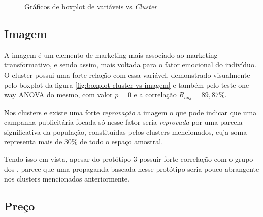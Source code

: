 \begin{figure}[h]
\begin{centering}
\par\end{centering}

\caption{Gráficos de boxplot de variáveis vs \emph{Cluster}}
\end{figure}

\subsection{Imagem}

A imagem é um elemento de marketing mais associado ao marketing transformativo,
e sendo assim, mais voltada para o fator emocional do indivíduo. O
cluster \emph{\nomeCb{}} possui uma forte relação com essa variável,
demonstrado visualmente pelo boxplot da figura \ref{fig:boxplot-cluster-vs-imagem}
e também pelo teste one-way ANOVA do mesmo, com valor $p=0$ e a correlação
$R_{adj}=89,87\%$.

Nos clusters \emph{\nomeCc{}} e \emph{\nomeCd{}} existe uma forte
\emph{reprovação} a imagem o que pode indicar que uma campanha publicitária
focada só nesse fator seria \emph{reprovada} por uma parcela significativa
da população, constituídas pelos clusters mencionados, cuja soma representa
mais de 30\% de todo o espaço amostral.

Tendo isso em vista, apesar do protótipo 3 possuir forte correlação
com o grupo dos \emph{\nomeCb{}}, parece que uma propaganda baseada
nesse protótipo seria pouco abrangente nos clusters mencionados anteriormente. 

\subsection{Preço}

